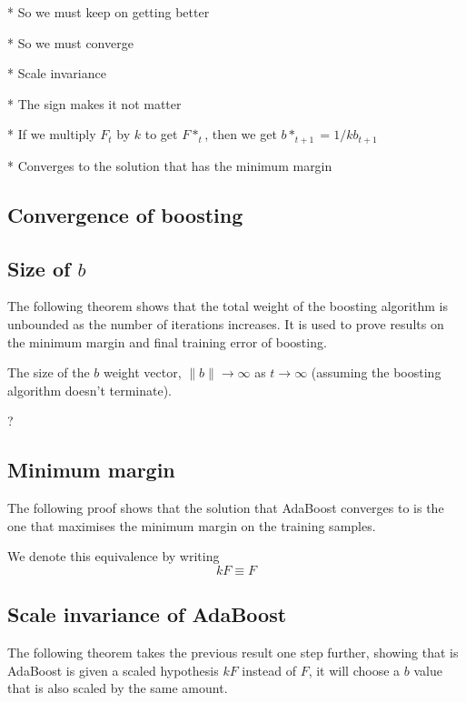   * So we must keep on getting better

  * So we must converge

* Scale invariance

  * The sign makes it not matter

  * If we multiply $F_t$ by $k$ to get $F*_t$, then we get $b*_{t+1} = 1/k
    b_{t+1}$

* Converges to the solution that has the minimum margin
	
\subsection{Convergence of boosting}




\subsection{Size of $b$}

The following theorem shows that the total weight of the boosting
algorithm is unbounded as the number of iterations increases.  It is
used to prove results on the minimum margin and final training error
of boosting.

\begin{theorem}
The size of the $b$ weight vector, $\|b\| \rightarrow \infty$
as $t \rightarrow \infty$ (assuming the boosting algorithm doesn't
terminate).

\proof ?
\end{theorem}


\subsection{Minimum margin}

The following proof shows that the solution that AdaBoost converges to
is the one that maximises the minimum margin on the training samples.



We denote this equivalence by writing
\[
kF \equiv F
\]


\subsection{Scale invariance of AdaBoost}

The following theorem takes the previous result one step further,
showing that is AdaBoost is given a scaled hypothesis $kF$ instead of
$F$, it will choose a $b$ value that is also scaled by the same
amount.

